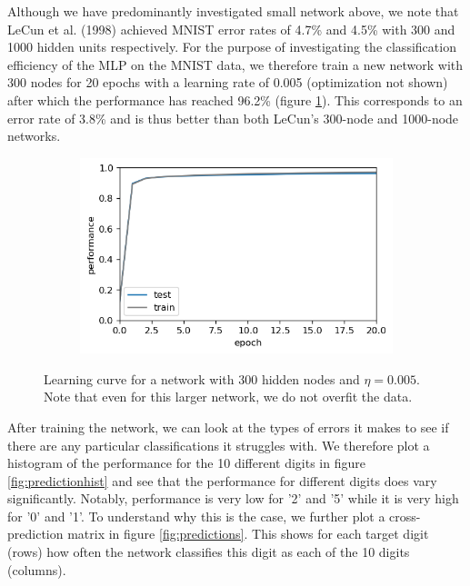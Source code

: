 \documentclass{article}
\begin{document}
Although we have predominantly investigated small network above, we note that LeCun et al. (1998) achieved MNIST error rates of 4.7\% and 4.5\% with 300 and 1000 hidden units respectively. For the purpose of investigating the classification efficiency of the MLP on the MNIST data, we therefore train a new network with 300 nodes for 20 epochs with a learning rate of 0.005 (optimization not shown) after which the performance has reached 96.2\% (figure \ref{fig:N300_performance}). This corresponds to an error rate of 3.8\% and is thus better than both LeCun's 300-node and 1000-node networks.

\begin{figure}[h]
	\centering
	\begin{subfigure}[t]{0.52\linewidth}
		\centering
		\includegraphics[width = 1.0\linewidth, trim={5 5 5 5}, clip=true]{figures/bias_N300_eta005_nepoch20_transfer_tanh_performance.png}
	\end{subfigure}%
\caption{Learning curve for a network with 300 hidden nodes and $\eta=0.005$. Note that even for this larger network, we do not overfit the data.}
\label{fig:N300_performance}
\end{figure}


After training the network, we can look at the types of errors it makes to see if there are any particular classifications it struggles with.  We therefore plot a histogram of the performance for the 10 different digits in figure \ref{fig:predictionhist} and see that the performance for different digits does vary significantly. Notably, performance is very low for '2' and '5' while it is very high for '0' and '1'.
To understand why this is the case, we further plot a cross-prediction matrix in figure \ref{fig:predictions}. This shows for each target digit (rows) how often the network classifies this digit as each of the 10 digits (columns).
\end{document}
